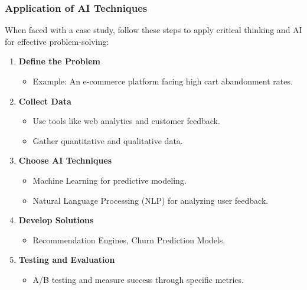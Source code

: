 \documentclass[aspectratio=169]{beamer}
\begin{document}
\begin{frame}[fragile]
    \frametitle{Application of AI Techniques}
    When faced with a case study, follow these steps to apply critical thinking and AI for effective problem-solving:
    \begin{enumerate}
        \item \textbf{Define the Problem}
        \begin{itemize}
            \item Example: An e-commerce platform facing high cart abandonment rates.
        \end{itemize}
        \item \textbf{Collect Data}
        \begin{itemize}
            \item Use tools like web analytics and customer feedback.
            \item Gather quantitative and qualitative data.
        \end{itemize}
        \item \textbf{Choose AI Techniques}
        \begin{itemize}
            \item Machine Learning for predictive modeling.
            \item Natural Language Processing (NLP) for analyzing user feedback.
        \end{itemize}
        \item \textbf{Develop Solutions}
        \begin{itemize}
            \item Recommendation Engines, Churn Prediction Models.
        \end{itemize}
        \item \textbf{Testing and Evaluation}
        \begin{itemize}
            \item A/B testing and measure success through specific metrics.
        \end{itemize}
    \end{enumerate}
\end{frame}
\end{document}
